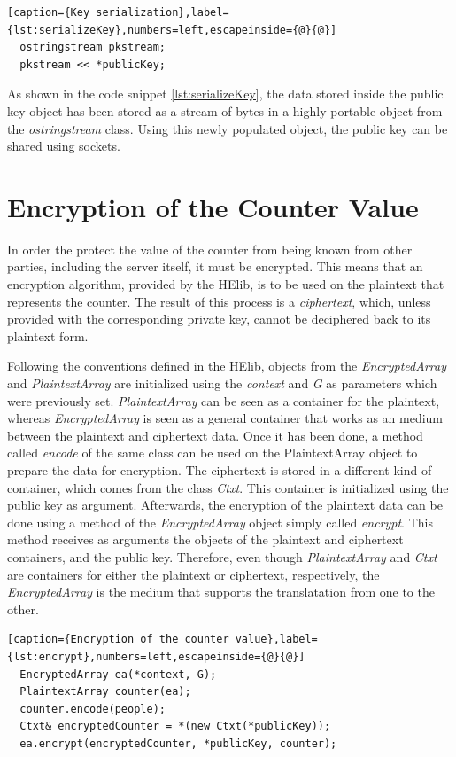 \begin{lstlisting}[caption={Key serialization},label={lst:serializeKey},numbers=left,escapeinside={@}{@}]
  ostringstream pkstream;
  pkstream << *publicKey;
\end{lstlisting}

As shown in the code snippet \ref{lst:serializeKey}, the data stored inside the public key object has been stored as a stream of bytes in a highly portable object from the \textit{ostringstream} class. Using this newly populated object, the public key can be shared using sockets.

\section{{Encryption of the Counter Value}}

In order the protect the value of the counter from being known from other parties, including the server itself, it must be encrypted. This means that an encryption algorithm, provided by the HElib, is to be used on the plaintext that represents the counter. The result of this process is a \emph{ciphertext}, which, unless provided with the corresponding private key, cannot be deciphered back to its plaintext form. 

Following the conventions defined in the HElib, objects from the \textit{EncryptedArray} and \textit{PlaintextArray} are initialized using the \textit{context} and \textit{G} as parameters which were previously set. \textit{PlaintextArray} can be seen as a container for the plaintext, whereas \textit{EncryptedArray} is seen as a general container that works as an medium between the plaintext and ciphertext data. Once it has been done, a method called \textit{encode} of the same class can be used on the PlaintextArray object to prepare the data for encryption. The ciphertext is stored in a different kind of container, which comes from the class \textit{Ctxt}. This container is initialized using the public key as argument. Afterwards, the encryption of the plaintext data can be done using a method of the \textit{EncryptedArray} object simply called \textit{encrypt}. This method receives as arguments the objects of the plaintext and ciphertext containers, and the public key. Therefore, even though \textit{PlaintextArray} and \textit{Ctxt} are containers for either the plaintext or ciphertext, respectively, the \textit{EncryptedArray} is the medium that supports the translatation from one to the other.

\begin{lstlisting}[caption={Encryption of the counter value},label={lst:encrypt},numbers=left,escapeinside={@}{@}]
  EncryptedArray ea(*context, G);
  PlaintextArray counter(ea);  
  counter.encode(people);
  Ctxt& encryptedCounter = *(new Ctxt(*publicKey));  
  ea.encrypt(encryptedCounter, *publicKey, counter); 
\end{lstlisting}

